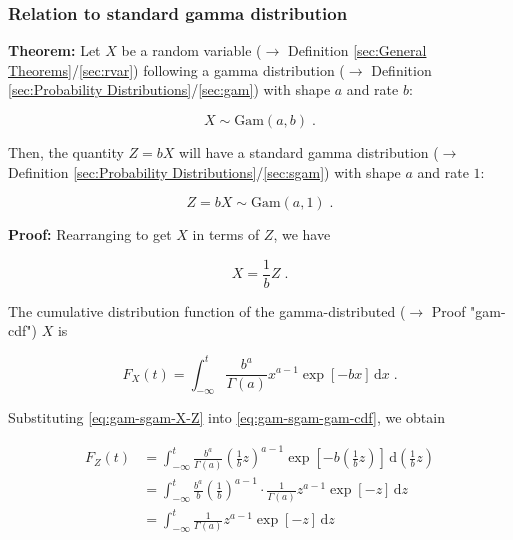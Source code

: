 \documentclass[a4paper,12pt,twoside]{book}
\begin{document}
\subsubsection[\textbf{Relation to standard gamma distribution}]{Relation to standard gamma distribution} \label{sec:gam-sgam}
\setcounter{equation}{0}

\textbf{Theorem:} Let $X$ be a random variable ($\rightarrow$ Definition \ref{sec:General Theorems}/\ref{sec:rvar}) following a gamma distribution ($\rightarrow$ Definition \ref{sec:Probability Distributions}/\ref{sec:gam}) with shape $a$ and rate $b$:

\begin{equation} \label{eq:gam-sgam-X-gam}
X \sim \mathrm{Gam}(a,b) \; .
\end{equation}

Then, the quantity $Z = b X$ will have a standard gamma distribution ($\rightarrow$ Definition \ref{sec:Probability Distributions}/\ref{sec:sgam}) with shape $a$ and rate $1$:

\begin{equation} \label{eq:gam-sgam-Z-snorm}
Z = b X \sim \mathrm{Gam}(a,1) \; .
\end{equation}


\vspace{1em}
\textbf{Proof:} Rearranging to get $X$ in terms of $Z$, we have

\begin{equation} \label{eq:gam-sgam-X-Z}
X = \frac{1}{b} Z \; .
\end{equation}

The cumulative distribution function of the gamma-distributed ($\rightarrow$ Proof "gam-cdf") $X$ is

\begin{equation} \label{eq:gam-sgam-gam-cdf}
F_X(t) = \int_{-\infty}^{t} \frac{b^a}{\Gamma(a)} x^{a-1} \exp[-b x] \, \mathrm{d}x \; .
\end{equation}

Substituting \eqref{eq:gam-sgam-X-Z} into \eqref{eq:gam-sgam-gam-cdf}, we obtain

\begin{equation} \label{eq:gam-sgam-sgam-cdf}
\begin{split}
F_Z(t) &= \int_{-\infty}^{t} \frac{b^a}{\Gamma(a)} \left(\frac{1}{b} z\right)^{a-1} \exp\left[-b \left(\frac{1}{b} z\right)\right] \, \mathrm{d}\left(\frac{1}{b} z\right) \\
&= \int_{-\infty}^{t} \frac{b^a}{b} \left(\frac{1}{b}\right)^{a-1} \cdot \frac{1}{\Gamma(a)} z^{a-1} \exp[-z] \, \mathrm{d}z \\
&= \int_{-\infty}^{t} \frac{1}{\Gamma(a)} z^{a-1} \exp[-z] \, \mathrm{d}z
\end{split}
\end{equation}
\end{document}
